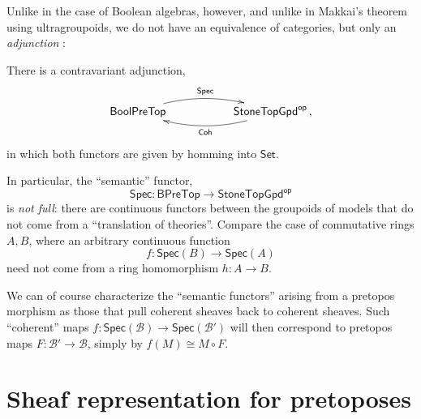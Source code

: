 \documentclass[graybox]{svmult}
\begin{document}
Unlike in the case of Boolean algebras, however, and unlike in Makkai's theorem using ultragroupoids, we do not have an equivalence of categories, but only an \emph{adjunction} \cite{AF,For}:
 
\begin{theorem}
There is a contravariant adjunction,
\[
\xymatrix{ 
\mathsf{BoolPreTop}  \ar@/{}^{1pc}/[rr]^{\mathsf{Spec}}     &&  \mathsf{StoneTopGpd}^{\mathsf{op}}  \ar@/{}^{1pc}/[ll]^{\mathsf{Coh}} \,,
} 
\]
in which both functors are given by homming into $\mathsf{Set}$.
\end{theorem}

In particular, the ``semantic'' functor,
\[
\mathsf{Spec} : \mathsf{BPreTop} \longrightarrow \mathsf{StoneTopGpd}^{\mathsf{op}}
\]
 is \emph{not full}: there are continuous functors between the groupoids of models that do not come from a ``translation of theories''.
Compare the case of commutative rings $A, B$, where an arbitrary continuous function $$f : \mathsf{Spec}(B) \to \mathsf{Spec}(A)$$ need not come from a ring homomorphism $h : A\to B$.  

We can of course characterize the ``semantic functors'' arising from a pretopos morphism as those that pull coherent sheaves back to coherent sheaves.  Such ``coherent'' maps  $f : \mathsf{Spec}(\mathcal{B}) \to \mathsf{Spec}(\mathcal{B'})$ will then correspond to pretopos maps $F : \mathcal{B'} \to \mathcal{B}$, simply  by $f(M) \cong M\circ F$. 



%


\section{Sheaf representation for pretoposes}
\end{document}
